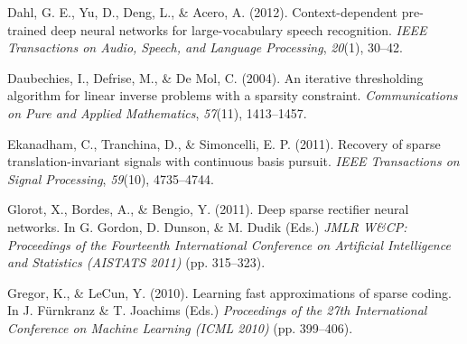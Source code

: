 \documentclass{article} %
\begin{document}
\begin{thebibliography}{100}
Dahl, G. E., Yu, D., Deng, L., \& Acero, A. (2012). 
\newblock Context-dependent pre-trained deep neural networks for large-vocabulary speech recognition. 
\newblock \emph{IEEE Transactions on Audio, Speech, and Language Processing}, \emph{20}(1), 30--42.

Daubechies, I., Defrise, M., \& De Mol, C. (2004). 
\newblock An iterative thresholding algorithm for linear inverse problems with a sparsity constraint. 
\newblock \emph{Communications on Pure and Applied Mathematics}, \emph{57}(11), 1413--1457.



Ekanadham, C., Tranchina, D., \& Simoncelli, E. P. (2011). 
\newblock Recovery of sparse translation-invariant signals with continuous basis pursuit.
\newblock \emph{IEEE Transactions on Signal Processing}, \emph{59}(10), 4735--4744.


Glorot, X., Bordes, A., \& Bengio, Y. (2011).
\newblock Deep sparse rectifier neural networks. 
\newblock In G. Gordon, D. Dunson, \& M. Dudik (Eds.) \emph{JMLR W\&CP: Proceedings of the Fourteenth International Conference on Artificial Intelligence and Statistics (AISTATS 2011)} (pp. 315--323).

Gregor, K., \& LeCun, Y. (2010).
\newblock Learning fast approximations of sparse coding.
\newblock In J. F{\"u}rnkranz \& T. Joachims (Eds.) \emph{Proceedings of the 27th International Conference on Machine Learning (ICML 2010)} (pp. 399--406).


\end{thebibliography}
\end{document}
